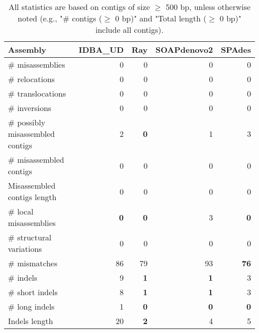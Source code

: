 \documentclass[12pt,a4paper]{article}
\begin{document}
\begin{table}[ht]
\begin{center}
\caption{All statistics are based on contigs of size $\geq$ 500 bp, unless otherwise noted (e.g., "\# contigs ($\geq$ 0 bp)" and "Total length ($\geq$ 0 bp)" include all contigs).}
\begin{tabular}{|l*{4}{|r}|}
\hline
Assembly & IDBA\_UD & Ray & SOAPdenovo2 & SPAdes \\ \hline
\# misassemblies & 0 & 0 & 0 & 0 \\ \hline
\hspace{5mm}\# relocations & 0 & 0 & 0 & 0 \\ \hline
\hspace{5mm}\# translocations & 0 & 0 & 0 & 0 \\ \hline
\hspace{5mm}\# inversions & 0 & 0 & 0 & 0 \\ \hline
\# possibly misassembled contigs & 2 & {\bf 0} & 1 & 3 \\ \hline
\# misassembled contigs & 0 & 0 & 0 & 0 \\ \hline
Misassembled contigs length & 0 & 0 & 0 & 0 \\ \hline
\# local misassemblies & {\bf 0} & {\bf 0} & 3 & {\bf 0} \\ \hline
\# structural variations & 0 & 0 & 0 & 0 \\ \hline
\# mismatches & 86 & 79 & 93 & {\bf 76} \\ \hline
\# indels & 9 & {\bf 1} & {\bf 1} & 3 \\ \hline
\hspace{5mm}\# short indels & 8 & {\bf 1} & {\bf 1} & 3 \\ \hline
\hspace{5mm}\# long indels & 1 & {\bf 0} & {\bf 0} & {\bf 0} \\ \hline
Indels length & 20 & {\bf 2} & 4 & 5 \\ \hline
\end{tabular}
\end{center}
\end{table}
\end{document}
